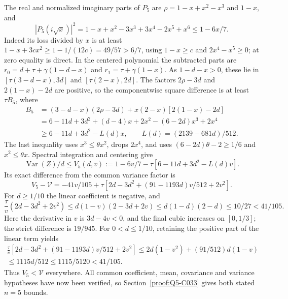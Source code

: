 The real and normalized imaginary parts of $P_5$ are
$\rho=1-x+x^2-x^3$ and $1-x$, and
\[
|P_5(i\sqrt x)|^2=1-x+x^2-3x^3+3x^4-2x^5+x^6\le1-6x/7.
\]
Indeed its loss divided by $x$ is at least
$1-x+3cx^2\ge1-1/(12c)=49/57>6/7$, using $1-x\ge c$ and
$2x^4-x^5\ge0$; at zero equality is direct.
In the centered polynomial the subtracted parts are
$r_0=d+\tau+\gamma(1-d-x)$ and $r_1=\tau+\gamma(1-x)$.
As $1-d-x>0$, these lie in $[\tau(3-d-x),3d]$ and
$[\tau(2-x),2d]$. The factors $2\rho-3d$ and $2(1-x)-2d$ are
positive, so the componentwise square difference is at least $\tau B_5$,
where
\[
\begin{aligned}
B_5&=(3-d-x)(2\rho-3d)+x(2-x)[2(1-x)-2d]\\
&=6-11d+3d^2+(d-4)x+2x^2-(6-2d)x^3+2x^4\\
&\ge6-11d+3d^2-L(d)x,\qquad L(d)=(2139-681d)/512.
\end{aligned}
\]
The last inequality uses $x^3\le\theta x^2$, drops $2x^4$, and uses
$(6-2d)\theta-2\ge1/6$ and $x^2\le\theta x$.
Spectral integration and centering give
\[
\operatorname{Var}(Z)/d\le V_5(d,v):=1-6v/7
-\tau[6-11d+3d^2-L(d)v].
\]
Its exact difference from the common variance factor is
\[
V_5-\mathcal V=-41v/105+\tau[2d-3d^2+(91-1193d)v/512+2v^2].
\]
For $d\ge1/10$ the linear coefficient is negative, and
\[
\frac\tau v(2d-3d^2+2v^2)
\le d(1-v)(2-3d+2v)\le d(1-d)(2-d)\le10/27<41/105.
\]
Here the derivative in $v$ is $3d-4v<0$, and the final cubic increases
on $[0,1/3]$; the strict difference is $19/945$.
For $0<d\le1/10$, retaining the positive part of the linear term yields
\[
\begin{gathered}
\frac\tau v[2d-3d^2+(91-1193d)v/512+2v^2]
\le2d(1-v^2)+(91/512)d(1-v)\\
\le1115d/512\le1115/5120<41/105.
\end{gathered}
\]
Thus $V_5<\mathcal V$ everywhere. All common coefficient, mean,
covariance and variance hypotheses have now been verified, so
Section~\ref{proof:Q5-C033} gives both stated $n=5$ bounds.

